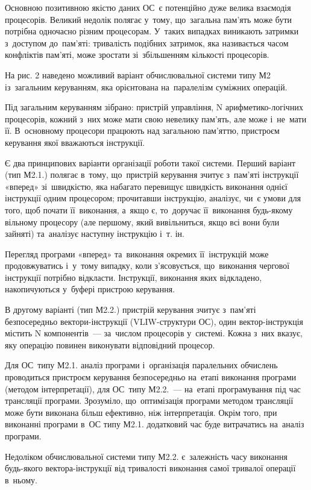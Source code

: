 \documentclass[
	a4paper,
	oneside,
	BCOR = 10mm,
	DIV = 12,
	12pt,
	headings = normal,
]{scrartcl}
\begin{document}
		Основною позитивною якістю даних ОС~є потенційно дуже велика взаємодія процесорів. Великий недолік полягає у~тому, що~загальна пам’ять може бути потрібна одночасно різним процесорам. У~таких випадках виникають затримки з~доступом до~пам’яті: тривалість подібних затримок, яка називається часом конфліктів пам'\-яті, може зростати зі~збільшенням кількості процесорів.

		На рис. 2 наведено можливий варіант обчислювальної системи типу М2 із~загальним керуванням, яка орієнтована на~паралелізм суміжних операцій.

		Під загальним керуванням зібрано: пристрій управління, N арифметико-логічних процесорів, кожний з~них може мати свою невелику пам'\-ять, але може і~не~мати її. В~основному процесори працюють над загальною пам'\-яттю, пристроєм керування якої вважаються інструкції.

		Є два принципових варіанти організації роботи такої системи. Перший варіант (тип М2.1.) полягає в~тому, що~пристрій керування зчитує з~пам'\-яті інструкції «вперед» зі~швидкістю, яка набагато перевищує швидкість виконання однієї інструкції одним процесором; прочитавши інструкцію, аналізує, чи~є умови для того, щоб почати її~виконання, а~якщо є, то~доручає її~виконання будь-якому вільному процесору (але першому, який вивільниться, якщо всі вони були зайняті) та~аналізує наступну інструкцію і~т. ін.

		Перегляд програми «вперед» та~виконання окремих її~інструкцій може продовжуватись і~у~тому випадку, коли з'\-ясовується, що~виконання чергової інструкції потрібно відкласти. Інструкції, виконання яких відкладено, накопичуються у~буфері пристрою керування.

		В другому варіанті (тип М2.2.) пристрій керування зчитує з~пам'\-яті безпосередньо вектори-інструкції (VLIW-структури ОС), один вектор-інструкція містить N компонентів~— за~числом процесорів у~системі. Кожна з~них вказує, яку операцію повинен виконувати відповідний процесор.

		Для ОС~типу М2.1. аналіз програми і~організація паралельних обчислень проводиться пристроєм керування безпосередньо на~етапі виконання програми (методом інтерпретації), для ОС~типу М2.2.~— на~етапі програмування під час трансляції програми. Зрозуміло, що~оптимізація програми методом трансляції може бути виконана більш ефективно, ніж інтерпретація. Окрім того, при виконанні програми в~ОС типу М2.1. додатковий час буде витрачатись на~аналіз програми.

		Недоліком обчислювальної системи типу М2.2. є~залежність часу виконання будь-якого вектора-інструкції від тривалості виконання самої тривалої операції в~ньому.
\end{document}
